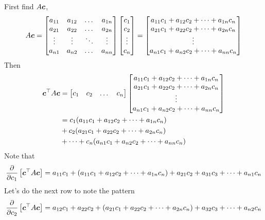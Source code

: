\documentclass[12pt]{article}
\begin{document}

\begin{enumerate}

First find $A\boldsymbol{c}$, $$ A\boldsymbol{c}= \begin{bmatrix} a_{11} & a_{12} & \dots & a_{1n} \\ a_{21} & a_{22} & \dots & a_{2n} \\ \vdots & \vdots & \ddots & \vdots \\ a_{n1} & a_{n2} & \dots & a_{nn} \end{bmatrix} \begin{bmatrix} c_1 \\ c_2 \\ \vdots \\ c_n \end{bmatrix} = \begin{bmatrix} a_{11}c_1 + a_{12}c_2 + \dots + a_{1n}c_n \\ a_{21}c_1 + a_{22}c_2 + \dots + a_{2n}c_n \\ \vdots \\ a_{n1}c_1 + a_{n2}c_2 + \dots + a_{nn}c_n \end{bmatrix} $$ 
Then 
$$ \begin{aligned} \boldsymbol{c}^\top A\boldsymbol{c} &= \begin{bmatrix} c_1 & c_2 & \dots & c_n \end{bmatrix} \begin{bmatrix} a_{11}c_1 + a_{12}c_2 + \dots + a_{1n}c_n \\ a_{21}c_1 + a_{22}c_2 + \dots + a_{2n}c_n \\ \vdots \\ a_{n1}c_1 + a_{n2}c_2 + \dots + a_{nn}c_n \end{bmatrix} \\ &= c_1(a_{11}c_1 + a_{12}c_2 + \dots + a_{1n}c_n) \\ &+ c_2(a_{21}c_1 + a_{22}c_2 + \dots + a_{2n}c_n) \\ &+ \dots + c_n(a_{n1}c_1 + a_{n2}c_2 + \dots + a_{nn}c_n) \end{aligned} $$ 
Note that $$ \dfrac{\partial}{\partial c_1}\left[\boldsymbol{c}^\top A\boldsymbol{c}\right] = a_{11}c_1 + (a_{11}c_1 + a_{12}c_2 + \dots + a_{1n}c_n) + a_{21}c_2 + a_{31}c_3 + \dots + a_{n1}c_n $$ 
Let's do the next row to note the pattern 
$$ \dfrac{\partial}{\partial c_2}\left[\boldsymbol{c}^\top A\boldsymbol{c}\right] = a_{12}c_1 + a_{22}c_2 + (a_{21}c_1 + a_{22}c_2 + \dots + a_{2n}c_n) + a_{32}c_3 + \dots + a_{n2}c_n$$ 

\end{enumerate}
\end{document}
